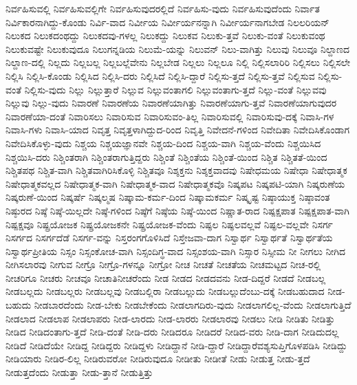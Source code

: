 {ನಿರ್ವಹಿಸುವಲ್ಲಿ
ನಿರ್ವಹಿಸುವಲ್ಲಿಗೇ
ನಿರ್ವಹಿಸುವುದರಲ್ಲಿದೆ
ನಿರ್ವಹಿಸು-ವುದು
ನಿರ್ವಹಿಸುವುದೆಂದು
ನಿರ್ವಾತ
ನಿರ್ವಿಕಾರನಾಗಿದ್ದು-ಕೊಂಡು
ನಿರ್ವಿ-ವಾದ
ನಿರ್ವೀಯ
ನಿರ್ವೀರ್ಯನನ್ನಾಗಿ
ನಿರ್ವೀರ್ಯನಾಗಬೇಡ
ನಿಲಲರಿಯನ್
ನಿಲುಕದ
ನಿಲುಕದಂಥದ್ದು
ನಿಲುಕದವು-ಗಳಲ್ಲ
ನಿಲುಕದ್ದು
ನಿಲುಕವ
ನಿಲುಕು-ತ್ತವೆ
ನಿಲುಕು-ವಂತೆ
ನಿಲುಕುವಂಥ
ನಿಲುಕುವಷ್ಟೇ
ನಿಲುಕುವುದೂ
ನಿಲುಗನ್ನಡಿಯ
ನಿಲುಮೆ-ಯನ್ನು
ನಿಲುವನ್
ನಿಲು-ವಾಗಿತ್ತು
ನಿಲುವು
ನಿಲುವೂ
ನಿಲ್ದಾಣದ
ನಿಲ್ದಾಣ-ದಲ್ಲಿ
ನಿಲ್ಲದು
ನಿಲ್ಲಬಲ್ಲ
ನಿಲ್ಲಬಲ್ಲೆವೇನು
ನಿಲ್ಲಬೇಡ
ನಿಲ್ಲಲು
ನಿಲ್ಲಲೂ
ನಿಲ್ಲಿ
ನಿಲ್ಲಿಸಲಾರಿರಿ
ನಿಲ್ಲಿಸಲು
ನಿಲ್ಲಿಸಲೇ
ನಿಲ್ಲಿಸಿ
ನಿಲ್ಲಿಸಿ-ಕೊಂಡು
ನಿಲ್ಲಿಸಿದ
ನಿಲ್ಲಿಸಿ-ದರು
ನಿಲ್ಲಿಸಿದೆ
ನಿಲ್ಲಿಸಿ-ದ್ದಾರೆ
ನಿಲ್ಲಿಸು-ತ್ತದೆ
ನಿಲ್ಲಿಸು-ತ್ತವೆ
ನಿಲ್ಲಿಸುವ
ನಿಲ್ಲಿಸು-ವಂತೆ
ನಿಲ್ಲಿಸು-ವುದು
ನಿಲ್ಲು
ನಿಲ್ಲುತ್ತಾರೆ
ನಿಲ್ಲುವ
ನಿಲ್ಲುವಂತಾಗಲಿ
ನಿಲ್ಲುವಂತಾಗು-ತ್ತದೆ
ನಿಲ್ಲು-ವಂತೆ
ನಿಲ್ಲುವವು
ನಿಲ್ಲುವು
ನಿಲ್ಲು-ವುದು
ನಿವಾರಣೆ
ನಿವಾರಣೆಯ
ನಿವಾರಣೆಯಾಗಿತ್ತು
ನಿವಾರಣೆಯಾಗು-ತ್ತವೆ
ನಿವಾರಣೆಯಾಗುವುದರ
ನಿವಾರಣೆಯಾ-ದಂತೆ
ನಿವಾರಿಸಲು
ನಿವಾರಿಸುವ
ನಿವಾರಿಸುವಂ-ತಿಲ್ಲ
ನಿವಾರಿಸುವಲ್ಲಿ
ನಿವಾರಿಸುವು-ದಕ್ಕೆ
ನಿವಾಸಿ-ಗಳ
ನಿವಾಸಿ-ಗಳು
ನಿವಾಸಿ-ಯಾದ
ನಿವೃತ್ತ
ನಿವೃತ್ತಳಾಗಿದ್ದುದ-ರಿಂದ
ನಿವೃತ್ತಿ
ನಿವೇದನೆ-ಗಳಿಂದ
ನಿವೇದಿತಾ
ನಿವೇದಿಸಿಕೊಂಡಾಗ
ನಿವೇದಿಸಿಕೊಳ್ಳು-ವುದು
ನಿಶ್ಚಯ
ನಿಶ್ಚಯಜ್ಞಾನವೇ
ನಿಶ್ಚಯ-ದಿಂದ
ನಿಶ್ಚಯ-ವಾಗಿ
ನಿಶ್ಚಯ-ವೆಂದು
ನಿಶ್ಚಯಿಸಿದ
ನಿಶ್ಚಯಿಸಿ-ದರು
ನಿಶ್ಚಿಂತರಾಗಿ
ನಿಶ್ಚಿಂತರಾಗುತ್ತಿದ್ದರು
ನಿಶ್ಚಿಂತೆ
ನಿಶ್ಚಿಂತೆಯ
ನಿಶ್ಚಿಂತೆ-ಯಿಂದ
ನಿಶ್ಚಿತ
ನಿಶ್ಚಿತತೆ-ಯಿಂದ
ನಿಶ್ಚಿತಪಥ
ನಿಶ್ಚಿತ-ವಾಗಿ
ನಿಶ್ಚಿತವಾಗಿರಿಸಿಕೊಳ್ಳಿ
ನಿಶ್ಚಿತವೂ
ನಿಶ್ಶಕ್ತನು
ನಿಶ್ಶಕ್ತವಾದವು
ನಿಷೇಧಮಯ
ನಿಷೇಧಾ
ನಿಷೇಧಾತ್ಮಕ
ನಿಷೇಧಾತ್ಮಕವಲ್ಲದ
ನಿಷೇಧಾತ್ಮಕ-ವಾಗಿ
ನಿಷೇಧಾತ್ಮಕ-ವಾದ
ನಿಷೇಧಾತ್ಮಕವೊ
ನಿಷ್ಕಪಟ
ನಿಷ್ಕಪಟಿ-ಯಾಗಿ
ನಿಷ್ಕರುಣೆಯ
ನಿಷ್ಕರುಣೆ-ಯಿಂದ
ನಿಷ್ಕರ್ಷೆ
ನಿಷ್ಕಲ್ಮಷ
ನಿಷ್ಕಾಮ-ಕರ್ಮ-ದಿಂದ
ನಿಷ್ಕಾಮಕರ್ಮ
ನಿಷ್ಕೃಷ್ಟ
ನಿಷ್ಠಾಯುಕ್ತ
ನಿಷ್ಠಾವಂತ
ನಿಷ್ಠುರದ
ನಿಷ್ಠೆ
ನಿಷ್ಠೆ-ಯಿಲ್ಲದೇ
ನಿಷ್ಠೆ-ಗಳಿಂದ
ನಿಷ್ಠೆಗೆ
ನಿಷ್ಠೆಯ
ನಿಷ್ಠೆ-ಯಿಂದ
ನಿಷ್ಣಾತ-ರಾದ
ನಿಷ್ಪಕ್ಷಪಾತ
ನಿಷ್ಪಕ್ಷಪಾತ-ವಾಗಿ
ನಿಷ್ಪಕ್ಷವೂ
ನಿಷ್ಪ್ರಯೋಜಕ
ನಿಷ್ಪ್ರಯೋಜಕನೇ
ನಿಷ್ಪ್ರಯೋಜಕ-ವೆಂದು
ನಿಷ್ಫಲ
ನಿಷ್ಫಲವಲ್ಲವೆ
ನಿಷ್ಫಲ-ವಲ್ಲವೇ
ನಿಸರ್ಗ
ನಿಸರ್ಗದ
ನಿಸರ್ಗದೆಡೆ
ನಿಸರ್ಗ-ವನ್ನು
ನಿಸ್ತರಂಗಗೊಳಿಸಿದೆ
ನಿಸ್ತೇಜವಾ-ದಾಗ
ನಿಸ್ವಾರ್ಥ
ನಿಸ್ವಾರ್ಥತೆ
ನಿಸ್ವಾರ್ಥತೆಯ
ನಿಸ್ವಾರ್ಥಪ್ರೀತಿಯ
ನಿಸ್ಸಂ
ನಿಸ್ಸಂಕೋಚ-ವಾಗಿ
ನಿಸ್ಸಂದಿಗ್ಧ-ವಾದ
ನಿಸ್ಸಂಶಯ-ವಾಗಿ
ನಿಸ್ಸಾರ
ನಿಸ್ಸೀಮ
ನೀ
ನೀಗಲು
ನೀಗಿದ
ನೀಗಿಸಲಾರವು
ನೀಗುವ
ನೀಗ್ರೊ
ನೀಗ್ರೊ-ಗಳನ್ನೂ
ನೀಗ್ರೋ
ನೀಚ
ನೀಚತೆ
ನೀಚತೆಯ
ನೀಚಮಟ್ಟದ
ನೀಚ-ರಲ್ಲಿ
ನೀಚರಿಗೂ
ನೀಚರು
ನೀಚವೂ
ನೀಚಾತಿನೀಚರೆಂದು
ನೀಡ
ನೀಡದ
ನೀಡದವನು
ನೀಡ-ದಿದ್ದರೆ
ನೀಡದೆ
ನೀಡಬಲ್ಲ
ನೀಡಬಲ್ಲದು
ನೀಡಬಲ್ಲರು
ನೀಡಬಲ್ಲವು
ನೀಡಬಲ್ಲಿರಾ
ನೀಡಬಲ್ಲುದು
ನೀಡಬಲ್ಲುದೆಂಬು-ದಕ್ಕೆ
ನೀಡಬಹುದಾದ
ನೀಡ-ಬಹುದು
ನೀಡಬಾರದೆಂದು
ನೀಡ-ಬೇಕು
ನೀಡಬೇಕೆಂದು
ನೀಡಲಾಗದಿರು-ವುದು
ನೀಡಲಾಗಲಿಲ್ಲ-ವೆಂದು
ನೀಡಲಾಗುತ್ತಿದೆ
ನೀಡಲಾದ
ನೀಡಲಾಪ
ನೀಡಲಾಪರು
ನೀಡ-ಲಾರದು
ನೀಡ-ಲಾರರು
ನೀಡಲಾರವು
ನೀಡಲು
ನೀಡಿ
ನೀಡಿತು
ನೀಡಿತ್ತು
ನೀಡಿದ
ನೀಡಿದಂತಾಗು-ತ್ತದೆ
ನೀಡಿ-ದಂತೆ
ನೀಡಿ-ದರು
ನೀಡಿದರೂ
ನೀಡಿದರೆ
ನೀಡಿದ-ವರು
ನೀಡಿ-ದಾಗ
ನೀಡಿದುದಲ್ಲ
ನೀಡಿದೆ
ನೀಡಿದೆಯೇ
ನೀಡಿದ್ದ
ನೀಡಿದ್ದರು
ನೀಡಿದ್ದಳು
ನೀಡಿದ್ದಾನೆ
ನೀಡಿ-ದ್ದಾರೆ
ನೀಡಿದ್ದಾರೆವಶ್ಯಸುಪ್ತಿಗೊಳಪಡಿಸಿ
ನೀಡಿದ್ದು
ನೀಡಿಯಾರು
ನೀಡಿರ-ಲಿಲ್ಲ
ನೀಡಿರುವರೋ
ನೀಡಿರುವುದೂ
ನೀಡೀತು
ನೀಡೀತೆ
ನೀಡು
ನೀಡುತ್ತ
ನೀಡು-ತ್ತದೆ
ನೀಡುತ್ತದೆಂದು
ನೀಡುತ್ತಾ
ನೀಡು-ತ್ತಾನೆ
ನೀಡುತ್ತಿತ್ತು
}
